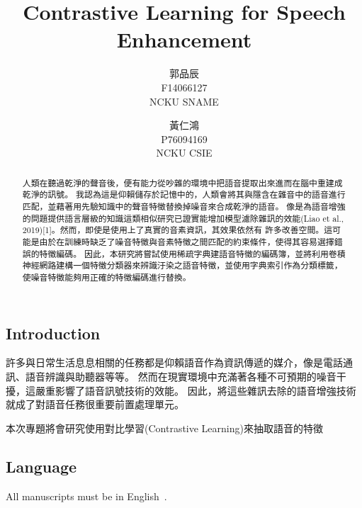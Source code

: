 \documentclass[10pt,twocolumn,letterpaper]{article}
\begin{document}
\begin{CJK}{UTF8}{bkai}
   \title{Contrastive Learning for Speech Enhancement}

   \author{
      郭品辰\\
      F14066127\\
      NCKU SNAME
      \and
      黃仁鴻\\
      P76094169\\
      NCKU CSIE
   }

   \maketitle

   \begin{abstract}
      人類在聽過乾淨的聲音後，便有能力從吵雜的環境中把語音提取出來進而在腦中重建成乾淨的訊號。
      我認為這是仰賴儲存於記憶中的，人類會將其與隱含在雜音中的語音進行匹配，並藉著用先驗知識中的聲音特徵替換掉噪音來合成乾淨的語音。
      像是為語音增強的問題提供語言層級的知識這類相似研究已證實能增加模型濾除雜訊的效能(Liao et al., 2019)[1]。然而，即使是使用上了真實的音素資訊，其效果依然有
      許多改善空間。這可能是由於在訓練時缺乏了噪音特徵與音素特徵之間匹配的約束條件，使得其容易選擇錯誤的特徵編碼。
      因此，本研究將嘗試使用稀疏字典建語音特徵的編碼簿，並將利用卷積神經網路建構一個特徵分類器來辨識汙染之語音特徵，並使用字典索引作為分類標籤，使噪音特徵能夠用正確的特徵編碼進行替換。
   \end{abstract}

   \section{Introduction}

   許多與日常生活息息相關的任務都是仰賴語音作為資訊傳遞的媒介，像是電話通訊、語音辨識與助聽器等等。
   然而在現實環境中充滿著各種不可預期的噪音干擾，這嚴重影響了語音訊號技術的效能。
   因此，將這些雜訊去除的語音增強技術就成了對語音任務很重要前置處理單元。~\cite{Alpher04}

   本次專題將會研究使用對比學習(Contrastive Learning)來抽取語音的特徵
   \subsection{Language}

   All manuscripts must be in English~\cite{Authors14}.


\end{CJK}
\end{document}
